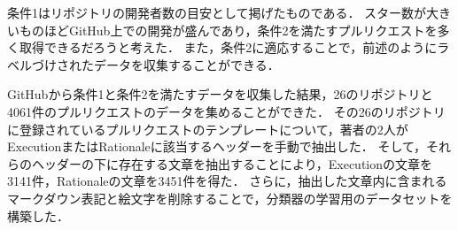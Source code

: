 条件1はリポジトリの開発者数の目安として掲げたものである．
スター数が大きいものほどGitHub上での開発が盛んであり，条件2を満たすプルリクエストを多く取得できるだろうと考えた．
また，条件2に適応することで，前述のようにラベルづけされたデータを収集することができる．

GitHubから条件1と条件2を満たすデータを収集した結果，26のリポジトリと4061件のプルリクエストのデータを集めることができた．
その26のリポジトリに登録されているプルリクエストのテンプレートについて，著者の2人がExecutionまたはRationaleに該当するヘッダーを手動で抽出した．
そして，それらのヘッダーの下に存在する文章を抽出することにより，Executionの文章を3141件，Rationaleの文章を3451件を得た．
さらに，抽出した文章内に含まれるマークダウン表記と絵文字を削除することで，分類器の学習用のデータセットを構築した．






